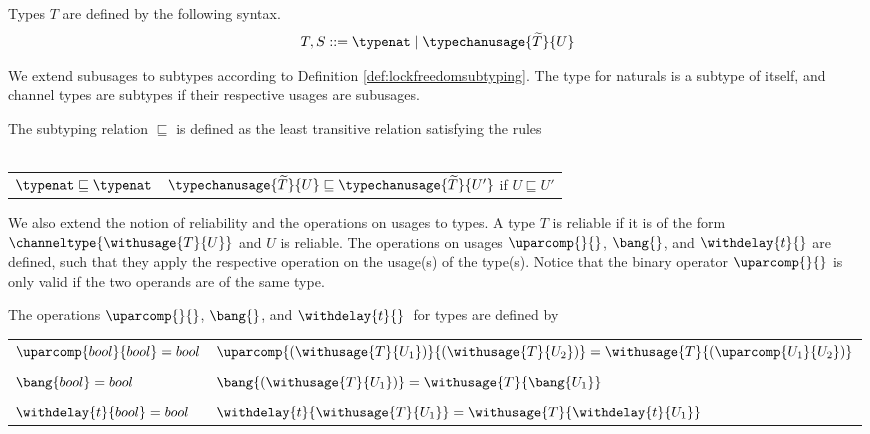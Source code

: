 \begin{defi}
Types $T$ are defined by the following syntax.
\begin{align*}
    T,S ::= \typenat \mid \typechanusage{\widetilde{T}}{U}
\end{align*}
\label{def:lockfreedomtypes}
\end{defi}

We extend subusages to subtypes according to Definition \ref{def:lockfreedomsubtyping}. The type for naturals is a subtype of itself, and channel types are subtypes if their respective usages are subusages.\\

\begin{defi}[Subtyping]
The subtyping relation $\sqsubseteq$ is defined as the least transitive relation satisfying the rules\\\\
\begin{tabular}{ll}
     $\typenat \sqsubseteq \typenat$ & $\typechanusage{\widetilde{T}}{U} \sqsubseteq \typechanusage{\widetilde{T}}{U'}$ if $U \sqsubseteq U'$\\
\end{tabular}
\label{def:lockfreedomsubtyping}
\end{defi}

We also extend the notion of reliability and the operations on usages to types. A type $T$ is reliable if it is of the form $\channeltype{\withusage{T}{U}}$ and $U$ is reliable. The operations on usages $\uparcomp{}{}$, $\bang{}$, and $\withdelay{t}{}$ are defined, such that they apply the respective operation on the usage(s) of the type(s). Notice that the binary operator $\uparcomp{}{}$ is only valid if the two operands are of the same type.

\begin{defi}
The operations $\uparcomp{}{}$, $\bang{}$, and $\withdelay{t}{}\;$ for types are defined by\\

\begin{tabular}{ll}
    $\uparcomp{bool}{bool} = bool$ & $\uparcomp{(\withusage{T}{U_1})}{(\withusage{T}{U_2})} = \withusage{T}{(\uparcomp{U_1}{U_2})}$ \\
    \vspace{-0.8em}\\
    $\bang{bool} = bool$ & $\bang{(\withusage{T}{U_1})} = \withusage{T}{\bang{U_1}}$\\
    \vspace{-0.8em}\\
    $\withdelay{t}{bool} = bool$ & $\withdelay{t}{\withusage{T}{U_1}} = \withusage{T}{\withdelay{t}{U_1}}$
\end{tabular}
\label{def:lockfreeops}
\end{defi}

